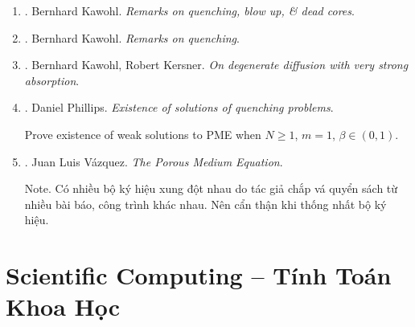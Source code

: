 \documentclass{article}
\begin{document}
\begin{enumerate}
	\item \cite{Kawohl1992}. {\sc Bernhard Kawohl}. {\it Remarks on quenching, blow up, \& dead cores}.
	\item \cite{Kawohl1996}. {\sc Bernhard Kawohl}. {\it Remarks on quenching}.
	\item \cite{Kawohl_Kersner1992}. {\sc Bernhard Kawohl, Robert Kersner}. {\it On degenerate diffusion with very strong absorption}.
	\item \cite{Phillips1987}. {\sc Daniel Phillips}. {\it Existence of solutions of quenching problems}.\hfill{\sf[100 citations]}
	
	Prove existence of weak solutions to PME when $N\ge1$, $m = 1$, $\beta\in(0,1)$.
	\item \cite{Vazquez2007}. {\sc Juan Luis V\'{a}zquez}. {\it The Porous Medium Equation}.
	
	{\sf Note.} Có nhiều bộ ký hiệu xung đột nhau do tác giả chắp vá quyển sách từ nhiều bài báo, công trình khác nhau. Nên cẩn thận khi thống nhất bộ ký hiệu.
\end{enumerate}


\section{Scientific Computing -- Tính Toán Khoa Học}
\end{document}
